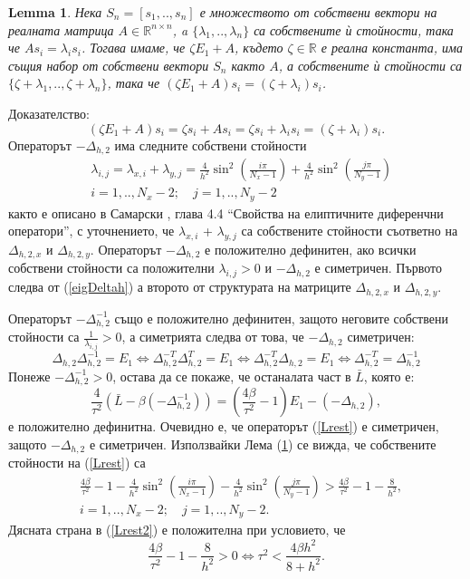 \documentclass[a4paper]{article}
\newcommand{\be}{\begin{equation}}
\newcommand{\ee}{\end{equation}}
\newcommand{\rf}[1]{(\ref{#1})}
\newcommand{\RR}{\mathbb{R}}
\newtheorem{lm}{Lemma}
\theoremstyle{remark}
\begin{document}
\begin{large}
\begin{lm}\label{lemma1}
Нека $S_n=[s_1,..,s_n]$ е множеството от собствени вектори на реалната матрица $A \in \RR^{n\times n}$,
a $\{\lambda_1,..,\lambda_n\}$ са собствените ѝ стойности, така че $A s_i = \lambda_i s_i$. Тогава имаме, че $\zeta E_1 + A$, където $\zeta \in \RR$ е реална константа, има същия набор от собствени вектори $S_n$ както $A$, а собствените ѝ стойности са $\{\zeta + \lambda_1,..,\zeta + \lambda_n\}$, така че $(\zeta E_1 + A)  s_i = (\zeta+ \lambda_i) s_i$.
\end{lm}
Доказателство:
\be
(\zeta E_1 + A)  s_i = \zeta s_i + A  s_i = \zeta s_i + \lambda_i s_i = (\zeta + \lambda_i) s_i.
\ee
Операторът $-\Delta_{h,2}$ има следните собствени стойности
\begin{align}\label{eigDeltah}
&\lambda_{i,j} = \lambda_{x, i} + \lambda_{y,j} = \frac{4}{h^2}\sin^2(\frac{i \pi}{N_x-1}) +  \frac{4}{h^2}\sin^2(\frac{j \pi}{N_y-1}) \\
&i = 1,..,N_x-2; \quad j = 1, .. , N_y-2 \nonumber
\end{align}
както е описано в Самарски \cite{samarski}, глава 4.4 ``Свойства на елиптичните диференчни оператори'', с уточнението, че $\lambda_{x, i}$ + $\lambda_{y,j}$ са собствените стойности съответно на $\Delta_{h,2,x}$ и $\Delta_{h,2,y}$. Операторът $-\Delta_{h,2}$ е положително дефинитен, ако всички собствени стойности са положителни $\lambda_{i,j}>0$ и $-\Delta_{h,2}$ е симетричен. Първото следва от \rf{eigDeltah} а второто от структурата на матриците $\Delta_{h,2,x}$ и $\Delta_{h,2,y}$.

Операторът $-\Delta_{h,2}^{-1}$ също е положително дефинитен, защото неговите собствени стойности са $\frac{1}{\lambda_{i,j}} > 0$, а симетрията следва от това, че $-\Delta_{h,2}$ симетричен:
\begin{equation*}
\Delta_{h,2}  \Delta_{h,2}^{-1} = E_1 \Leftrightarrow \Delta_{h,2}^{-T}  \Delta_{h,2}^{T} = E_1 \Leftrightarrow \Delta_{h,2}^{-T}  \Delta_{h,2} = E_1 
\Leftrightarrow \Delta_{h,2}^{-T} = \Delta_{h,2}^{-1} 
\end{equation*}
Понеже $-\Delta_{h,2}^{-1} > 0$, остава да се покаже, че останалата част в $\bar L$, която е:
\be\label{Lrest}
\frac{4}{\tau^2}\left( \bar L - \beta ( - \Delta_{h,2}^{-1}) \right) = \left( \frac{4 \beta}{\tau^2} - 1\right) E_1 -(-\Delta_{h,2}),
\ee
е положително дефинитна. Очевидно е, че операторът \rf{Lrest} е симетричен, защото $-\Delta_{h,2}$ е симетричен. Използвайки Лема \rf{lemma1} се вижда, че собствените стойности на \rf{Lrest} са
\begin{align}\label{Lrest2}
 &\frac{4 \beta}{\tau^2} - 1 - \frac{4}{h^2}\sin^2(\frac{i \pi}{N_x-1}) - \frac{4}{h^2}\sin^2(\frac{j \pi}{N_y-1}) > \frac{4 \beta}{\tau^2} - 1 - \frac{8}{h^2}, \\
&i = 1,..,N_x-2; \quad j = 1, .. , N_y-2. \nonumber
\end{align}
Дясната страна в \rf{Lrest2} е положителна при условието, че
\be\label{stabCond}
\frac{4 \beta}{\tau^2} - 1 - \frac{8}{h^2} > 0  \Leftrightarrow \tau^2 < \frac{4 \beta h^2}{8 + h^2}.
\ee


\end{large}
\end{document}
